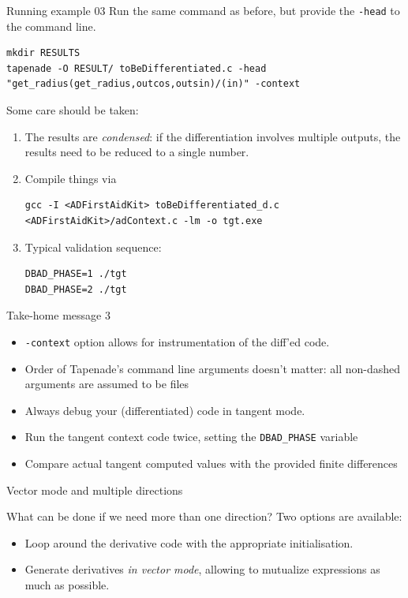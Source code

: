 \documentclass[12pt,xcolor={table}]{beamer}
\begin{document}
\begin{frame}[fragile]{Running example 03}
  Run the same command as before, but provide the \texttt{-head} to the command line.
  \begin{lstlisting}
mkdir RESULTS
tapenade -O RESULT/ toBeDifferentiated.c -head "get_radius(get_radius,outcos,outsin)/(in)" -context
  \end{lstlisting}
  
  Some care should be taken: 
  \begin{enumerate}
    \item The results are \emph{condensed}: if the differentiation involves multiple outputs, the results need to be reduced to a single number. 
    \item Compile things via 
    \begin{lstlisting}
gcc -I <ADFirstAidKit> toBeDifferentiated_d.c <ADFirstAidKit>/adContext.c -lm -o tgt.exe
    \end{lstlisting}
    \item Typical validation sequence:
      \begin{lstlisting}
DBAD_PHASE=1 ./tgt
DBAD_PHASE=2 ./tgt
      \end{lstlisting}
  \end{enumerate}
\end{frame}

\begin{frame}{Take-home message 3}
  \begin{itemize}
    \item \texttt{-context} option allows for instrumentation of the diff'ed code.
    \item Order of Tapenade's command line arguments doesn't matter: all non-dashed arguments are assumed to be files
    \item Always debug your (differentiated) code in tangent mode.
    \item Run the tangent context code twice, setting the \texttt{DBAD\_PHASE} variable
    \item Compare actual tangent computed values with the provided finite differences
  \end{itemize}
\end{frame}

\begin{frame}{Vector mode and multiple directions}
  \begin{block}{What can be done if we need more than one direction?}
    Two options are available: 
    \begin{itemize}
      \item Loop around the derivative code with the appropriate initialisation.
      \item Generate derivatives \emph{in vector mode}, allowing to mutualize expressions as much as possible.
    \end{itemize}
  \end{block}
\end{frame}
\end{document}
